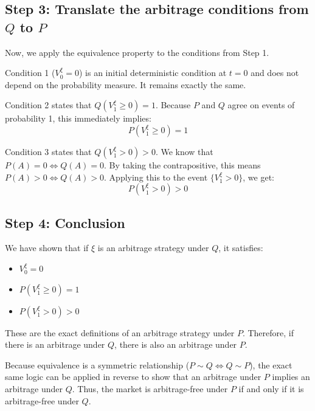 \subsection*{Step 3: Translate the arbitrage conditions from $Q$ to $P$}
Now, we apply the equivalence property to the conditions from Step 1.

Condition 1 ($V_{0}^{\xi} = 0$) is an initial deterministic condition at $t=0$ and does not depend on the probability measure. It remains exactly the same.

Condition 2 states that $Q(V_{1}^{\xi} \ge 0) = 1$. Because $P$ and $Q$ agree on events of probability 1, this immediately implies:
\begin{equation}
    P(V_{1}^{\xi} \ge 0) = 1
\end{equation}

Condition 3 states that $Q(V_{1}^{\xi} > 0) > 0$. We know that $P(A) = 0 \iff Q(A) = 0$. By taking the contrapositive, this means $P(A) > 0 \iff Q(A) > 0$. Applying this to the event $\{V_{1}^{\xi} > 0\}$, we get:
\begin{equation}
    P(V_{1}^{\xi} > 0) > 0
\end{equation}

\subsection*{Step 4: Conclusion}
We have shown that if $\xi$ is an arbitrage strategy under $Q$, it satisfies:
\begin{itemize}
    \item $V_{0}^{\xi} = 0$
    \item $P(V_{1}^{\xi} \ge 0) = 1$
    \item $P(V_{1}^{\xi} > 0) > 0$
\end{itemize}
These are the exact definitions of an arbitrage strategy under $P$. Therefore, if there is an arbitrage under $Q$, there is also an arbitrage under $P$.

Because equivalence is a symmetric relationship ($P \sim Q \iff Q \sim P$), the exact same logic can be applied in reverse to show that an arbitrage under $P$ implies an arbitrage under $Q$. Thus, the market is arbitrage-free under $P$ if and only if it is arbitrage-free under $Q$.